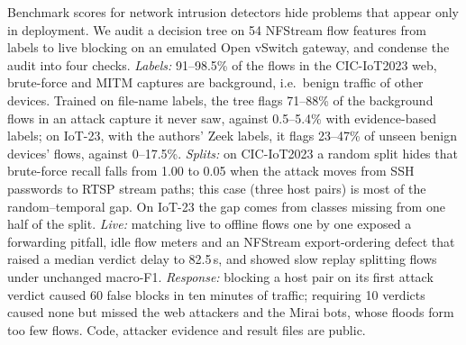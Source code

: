 Benchmark scores for network intrusion detectors hide problems that appear only in deployment. We audit a decision tree on 54 NFStream flow features from labels to live blocking on an emulated Open vSwitch gateway, and condense the audit into four checks. \emph{Labels:} 91--98.5\% of the flows in the CIC-IoT2023 web, brute-force and MITM captures are background, i.e.\ benign traffic of other devices. Trained on file-name labels, the tree flags 71--88\% of the background flows in an attack capture it never saw, against 0.5--5.4\% with evidence-based labels; on IoT-23, with the authors' Zeek labels, it flags 23--47\% of unseen benign devices' flows, against 0--17.5\%. \emph{Splits:} on CIC-IoT2023 a random split hides that brute-force recall falls from 1.00 to 0.05 when the attack moves from SSH passwords to RTSP stream paths; this case (three host pairs) is most of the random--temporal gap. On IoT-23 the gap comes from classes missing from one half of the split. \emph{Live:} matching live to offline flows one by one exposed a forwarding pitfall, idle flow meters and an NFStream export-ordering defect that raised a median verdict delay to 82.5\,s, and showed slow replay splitting flows under unchanged macro-F1. \emph{Response:} blocking a host pair on its first attack verdict caused 60 false blocks in ten minutes of traffic; requiring 10 verdicts caused none but missed the web attackers and the Mirai bots, whose floods form too few flows. Code, attacker evidence and result files are public.
